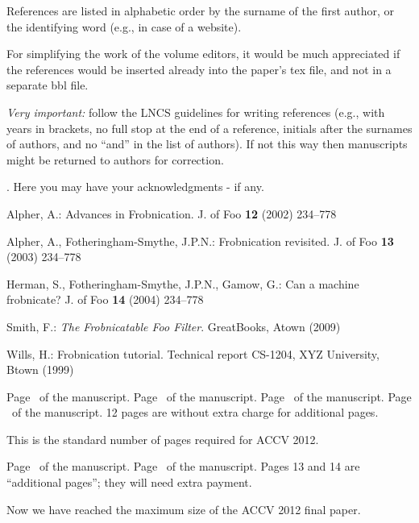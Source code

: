 \documentclass[runningheads]{llncs}
\begin{document}
References are listed in alphabetic order by the surname of the first author, or the
identifying word (e.g., in case of a website).

For simplifying the work of the volume editors, it would be much appreciated
if the references would be inserted already into the paper's tex file, and not
in a separate bbl file.

{\it Very important:} follow the LNCS guidelines for writing references (e.g., with years
in brackets, no full stop at the end of a reference, initials after the surnames of
authors, and no ``and'' in the list of authors). If not this way then manuscripts might be returned
to authors for correction.

\vspace{3mm}
. Here you may have your acknowledgments - if any.



\begin{thebibliography}{1}

Alpher, A.:
Advances in Frobnication.
J. of Foo
\textbf{12} (2002)  234--778

Alpher, A., Fotheringham-Smythe, J.P.N.:
Frobnication revisited.
J. of Foo
\textbf{13} (2003)  234--778

Herman, S., Fotheringham-Smythe, J.P.N., Gamow, G.:
Can a machine frobnicate?
J. of Foo
\textbf{14} (2004)  234--778

Smith, F.:
{\it The Frobnicatable Foo Filter}.
GreatBooks, Atown (2009)

Wills, H.:
Frobnication tutorial.
Technical report CS-1204, XYZ University, Btown (1999)

\end{thebibliography}


\clearpage\mbox{}Page \thepage\ of the manuscript.
\clearpage\mbox{}Page \thepage\ of the manuscript.
\clearpage\mbox{}Page \thepage\ of the manuscript.
\clearpage\mbox{}Page \thepage\ of the manuscript.
12 pages are without extra charge for additional pages.
\par\vfill\par
This is the standard number of pages required for ACCV 2012.

\clearpage\mbox{}Page \thepage\ of the manuscript.
\clearpage\mbox{}Page \thepage\ of the manuscript.
Pages 13 and 14 are ``additional pages''; they will need extra payment.
\par\vfill\par
Now we have reached the maximum size of the ACCV 2012 final paper.
\end{document}
